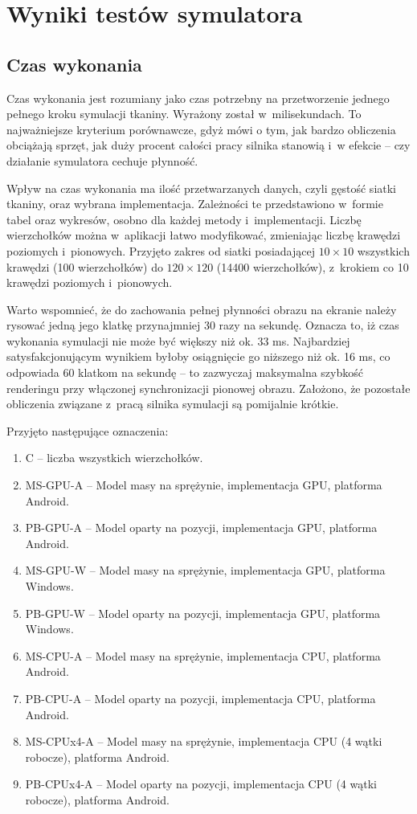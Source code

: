 \chapter{Wyniki testów symulatora}
\label{t:wyniki}

	\section{Czas wykonania}
	\label{t:wyniki:czas_wykonania}

		Czas wykonania jest rozumiany jako czas potrzebny na przetworzenie jednego pełnego kroku symulacji tkaniny. Wyrażony został w~milisekundach. To najważniejsze kryterium porównawcze, gdyż mówi o tym, jak bardzo obliczenia obciążają sprzęt, jak duży procent całości pracy silnika stanowią i~w efekcie -- czy działanie symulatora cechuje płynność. 
		
		Wpływ na czas wykonania ma ilość przetwarzanych danych, czyli gęstość siatki tkaniny, oraz wybrana implementacja. Zależności te przedstawiono w~formie tabel oraz wykresów, osobno dla każdej metody i~implementacji. Liczbę wierzchołków można w~aplikacji łatwo modyfikować, zmieniając liczbę krawędzi poziomych i~pionowych. Przyjęto zakres od siatki posiadającej \(10 \times 10 \) wszystkich krawędzi (100 wierzchołków) do \( 120 \times 120 \) (14400 wierzchołków), z~krokiem co 10 krawędzi poziomych i~pionowych.
		
		Warto wspomnieć, że do zachowania pełnej płynności obrazu na ekranie należy rysować jedną jego klatkę przynajmniej 30 razy na sekundę. Oznacza to, iż czas wykonania symulacji nie może być większy niż ok. 33 ms. Najbardziej satysfakcjonującym wynikiem byłoby osiągnięcie go niższego niż ok. 16 ms, co odpowiada 60 klatkom na sekundę -- to zazwyczaj maksymalna szybkość renderingu przy włączonej synchronizacji pionowej obrazu. Założono, że pozostałe obliczenia związane z~pracą silnika symulacji są pomijalnie krótkie.
		
		Przyjęto następujące oznaczenia:
		
		\begin{enumerate}
			\item C -- liczba wszystkich wierzchołków.
			\item MS-GPU-A -- Model masy na sprężynie, implementacja GPU, platforma Android.
			\item PB-GPU-A -- Model oparty na pozycji, implementacja GPU, platforma Android.
			\item MS-GPU-W -- Model masy na sprężynie, implementacja GPU, platforma Windows.
			\item PB-GPU-W -- Model oparty na pozycji, implementacja GPU, platforma Windows.
			\item MS-CPU-A -- Model masy na sprężynie, implementacja CPU, platforma Android.
			\item PB-CPU-A -- Model oparty na pozycji, implementacja CPU, platforma Android.
			\item MS-CPUx4-A -- Model masy na sprężynie, implementacja CPU (4 wątki robocze), platforma Android.
			\item PB-CPUx4-A -- Model oparty na pozycji, implementacja CPU (4 wątki robocze), platforma Android.
		\end{enumerate}
		
